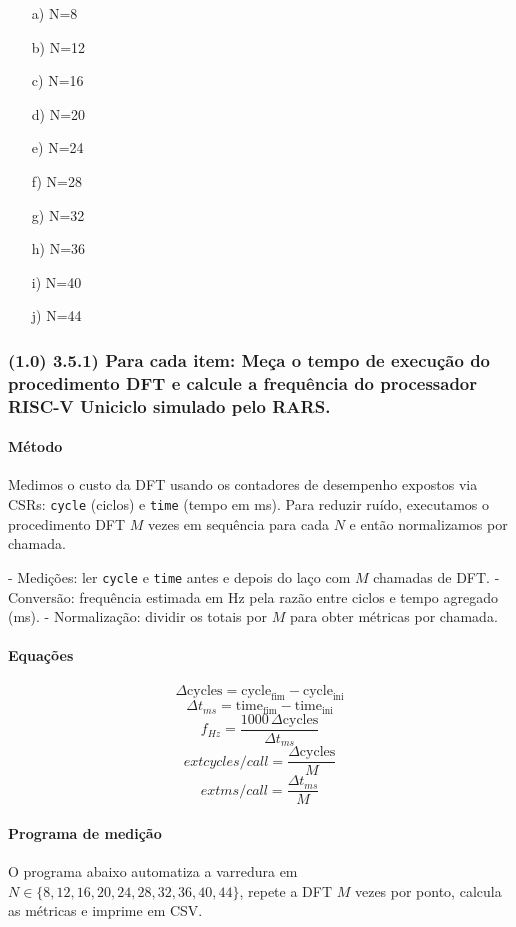\documentclass[12pt,a4paper]{article}
\begin{document}
\begin{enumerate}
    \item[a)] N=8
    \item[b)] N=12
    \item[c)] N=16
    \item[d)] N=20
    \item[e)] N=24
    \item[f)] N=28
    \item[g)] N=32
    \item[h)] N=36
    \item[i)] N=40
    \item[j)] N=44
\end{enumerate}

\subsubsection*{(1.0) 3.5.1) Para cada item: Meça o tempo de execução do procedimento DFT e calcule a frequência do processador RISC-V Uniciclo simulado pelo RARS.}
\paragraph{Método}
Medimos o custo da DFT usando os contadores de desempenho expostos via CSRs: \texttt{cycle} (ciclos) e \texttt{time} (tempo em ms). Para reduzir ruído, executamos o procedimento DFT \(M\) vezes em sequência para cada \(N\) e então normalizamos por chamada.

- Medições: ler \texttt{cycle} e \texttt{time} antes e depois do laço com \(M\) chamadas de DFT.
- Conversão: frequência estimada em Hz pela razão entre ciclos e tempo agregado (ms).
- Normalização: dividir os totais por \(M\) para obter métricas por chamada.

\paragraph{Equações}
\[
\Delta\!\text{cycles} = \text{cycle}_{\text{fim}} - \text{cycle}_{\text{ini}}
\]
\[
\Delta\!t_{ms} = \text{time}_{\text{fim}} - \text{time}_{\text{ini}}
\]
\[
f_{Hz} = \frac{1000\,\Delta\!\text{cycles}}{\Delta\!t_{ms}}
\]
\[
	ext{cycles/call} = \frac{\Delta\!\text{cycles}}{M}
\]
\[
	ext{ms/call} = \frac{\Delta\!t_{ms}}{M}
\]

\paragraph{Programa de medição}
O programa abaixo automatiza a varredura em \(N\in\{8,12,16,20,24,28,32,36,40,44\}\), repete a DFT \(M\) vezes por ponto, calcula as métricas e imprime em CSV.
\end{document}
